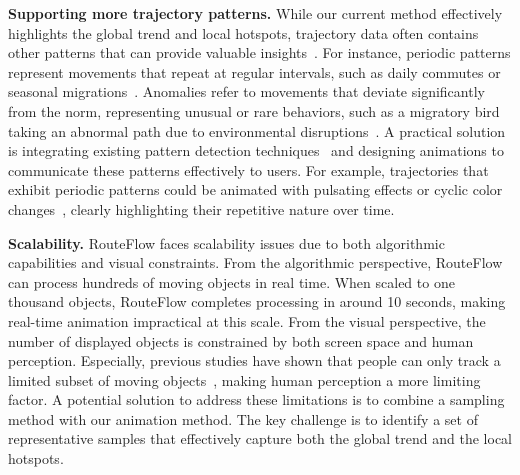 \noindent\textbf{Supporting more trajectory patterns.}
While our current method effectively highlights the global trend and local hotspots, trajectory data often contains other patterns that can provide valuable insights~\cite{zheng2015trajectory}.
For instance, periodic patterns represent movements that repeat at regular intervals, such as daily commutes or seasonal migrations~\cite{cao2007periodic}.
Anomalies refer to movements that deviate significantly from the norm, representing unusual or rare behaviors, such as a migratory bird taking an abnormal path due to environmental disruptions~\cite{liu2014fraud,liu2011anomaly}.
A practical solution is integrating existing pattern detection techniques~\cite{chandola2009anomaly} and designing animations to communicate these patterns effectively to users.
For example, trajectories that exhibit periodic patterns could be animated with pulsating effects or cyclic color changes~\cite{aigner2011visualization}, clearly highlighting their repetitive nature over time.

\noindent\textbf{Scalability.}
RouteFlow faces scalability issues due to both algorithmic capabilities and visual constraints.
From the algorithmic perspective, RouteFlow can process hundreds of moving objects in real time.
When scaled to one thousand objects, RouteFlow completes processing in around 10 seconds, making real-time animation impractical at this scale.
From the visual perspective, the number of displayed objects is constrained by both screen space and human perception.
Especially, previous studies have shown that people can only track a limited subset of moving objects~\cite{feria2012effects, franconeri2010tracking},
making human perception a more limiting factor.
A potential solution to address these limitations is to combine a sampling method with our animation method. 
The key challenge is to identify a set of representative samples that effectively capture both the global trend and the local hotspots.


